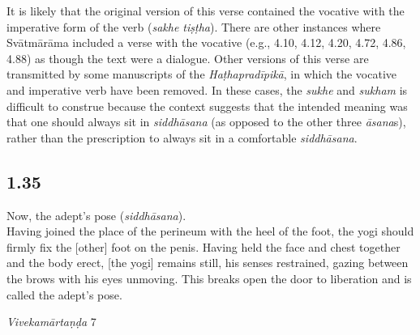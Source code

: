 \begin{ekdosis}
\begin{testimonia}[hp01_034]
\end{testimonia}

\begin{philcomm}[hp01_034]
It is likely that the original version of this verse contained the vocative with the imperative form of the verb (\emph{sakhe tiṣṭha}). There are other instances where Svātmārāma included a verse with the vocative (e.g., 4.10, 4.12, 4.20, 4.72, 4.86, 4.88) as though the text were a dialogue. Other versions of this verse are transmitted by some manuscripts of the \emph{Haṭhapradīpikā}, in which the vocative and imperative verb have been removed. In these cases, the \emph{sukhe} and \emph{sukham} is difficult to construe because the context suggests that the intended meaning was that one should always sit in \emph{siddhāsana} (as opposed to the other three \emph{āsana}s), rather than the prescription to always sit in a comfortable \emph{siddhāsana}.   
\end{philcomm}

\subsection*{1.35}
\begin{translation}[hp01_035]
Now, the adept's pose (\emph{siddhāsana}).\\ 
Having joined the place of the perineum with the heel of the foot, the yogi should firmly fix the [other] foot on the penis. Having held the face and chest together and the body erect, [the yogi] remains still, his senses restrained, gazing between the brows with his eyes unmoving. This breaks open the door to liberation and is called the adept’s pose.
\end{translation}

\begin{sources}[hp01_035]
\emph{Vivekamārtaṇḍa} 7


\end{sources}
\end{ekdosis}
